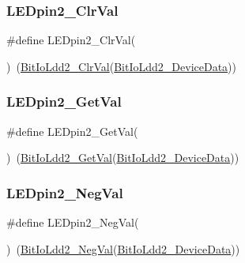 \subsubsection{\texorpdfstring{L\+E\+Dpin2\+\_\+\+Clr\+Val}{LEDpin2\_ClrVal}}
{\footnotesize\ttfamily \#define L\+E\+Dpin2\+\_\+\+Clr\+Val(\begin{DoxyParamCaption}{ }\end{DoxyParamCaption})~(\hyperlink{group___bit_io_ldd2__module_ga544e4e9c98ec5fa4934bcac68c17d303}{Bit\+Io\+Ldd2\+\_\+\+Clr\+Val}(\hyperlink{group___bit_io_ldd2__module_gaf2ef02c6b9a8451493963d7ae23c7574}{Bit\+Io\+Ldd2\+\_\+\+Device\+Data}))}

\mbox{\label{group___l_e_dpin2__module_ga061f97147af260178617a3fc72624300}} 
\subsubsection{\texorpdfstring{L\+E\+Dpin2\+\_\+\+Get\+Val}{LEDpin2\_GetVal}}
{\footnotesize\ttfamily \#define L\+E\+Dpin2\+\_\+\+Get\+Val(\begin{DoxyParamCaption}{ }\end{DoxyParamCaption})~(\hyperlink{group___bit_io_ldd2__module_gab03a5a6cf33499000ac033b999a4f587}{Bit\+Io\+Ldd2\+\_\+\+Get\+Val}(\hyperlink{group___bit_io_ldd2__module_gaf2ef02c6b9a8451493963d7ae23c7574}{Bit\+Io\+Ldd2\+\_\+\+Device\+Data}))}

\mbox{\label{group___l_e_dpin2__module_ga785294b54fde11d21a6c5ed73ddbabdd}} 
\subsubsection{\texorpdfstring{L\+E\+Dpin2\+\_\+\+Neg\+Val}{LEDpin2\_NegVal}}
{\footnotesize\ttfamily \#define L\+E\+Dpin2\+\_\+\+Neg\+Val(\begin{DoxyParamCaption}{ }\end{DoxyParamCaption})~(\hyperlink{group___bit_io_ldd2__module_ga90ce20ceb13c4409d5526b15f0054e1a}{Bit\+Io\+Ldd2\+\_\+\+Neg\+Val}(\hyperlink{group___bit_io_ldd2__module_gaf2ef02c6b9a8451493963d7ae23c7574}{Bit\+Io\+Ldd2\+\_\+\+Device\+Data}))}

